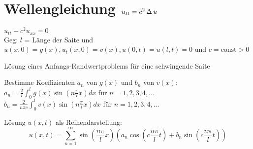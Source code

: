 \documentclass[german,color,5pt]{latex4ei/latex4ei_fs}
\begin{document}
\section{Wellengleichung \quad \(u_{tt}=c^{2} \operatorname{\Delta}{u} \)}
\begin{sectionbox}
\(u_{tt}-c^{2} u_{xx}=0\) \\
Geg: \(l\) = Länge der Saite und \(u(x,0)=g(x), u_{t}(x,0)=v(x), u(0,t)=u(l,t)=0\) und \(c=\mathrm{const}>0 \)
\begin{cookbox}{Lösung eines Anfangs-Randwertproblems für eine schwingende Saite}
\item Bestimme Koeffizienten \(a_{n}\) von \(g(x)\) und \(b_{n}\) von \(v(x)\): \\
\(a_{n}=\frac{2}{l}\int_0^l  g(x)\sin\left(n\frac{\pi}{l}x\right)dx\) \qquad für \(n=1,2,3,4,... \)\\
\(b_{n}=\frac{2}{n\pi c} \int_0^l  v(x)\sin\left(n\frac{\pi}{l}x\right)dx\) \qquad für \(n=1,2,3,4,... \)
\item Lösung \(u(x,t)\) als Reihendarstellung: \vspace{-5pt}		 								%
\[u\left(x,t\right)= \sum_{n=1}^{\infty} \sin\left(\frac{n \pi}{l}x\right)\left(a_{n}\cos\left(c\frac{n\pi}{l}t\right)+b_{n}\sin\left(c\frac{n\pi}{l}t\right)\right)\]
\end{cookbox}
\end{sectionbox}

\vspace{-1cm} 							%

\end{document}
